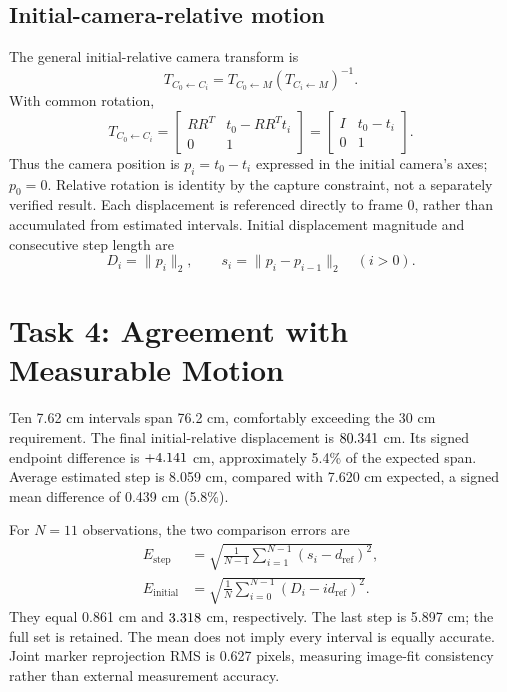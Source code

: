 \documentclass[conference,letterpaper]{IEEEtran}
\begin{document}
\subsection{Initial-camera-relative motion}
The general initial-relative camera transform is
\begin{equation}
T_{C_0\leftarrow C_i}=T_{C_0\leftarrow M}
(T_{C_i\leftarrow M})^{-1}.
\end{equation}
With common rotation,
\begin{equation}
T_{C_0\leftarrow C_i}
=\begin{bmatrix}RR^T&t_0-RR^Tt_i\\0&1\end{bmatrix}
=\begin{bmatrix}I&t_0-t_i\\0&1\end{bmatrix}.
\label{eq:relative}
\end{equation}
Thus the camera position is $p_i=t_0-t_i$ expressed in the initial camera's axes; $p_0=0$. Relative rotation is identity by the capture constraint, not a separately verified result. Each displacement is referenced directly to frame 0, rather than accumulated from estimated intervals. Initial displacement magnitude and consecutive step length are
\begin{equation}
D_i=\|p_i\|_2,\qquad s_i=\|p_i-p_{i-1}\|_2\quad(i>0).
\end{equation}

\section{Task 4: Agreement with Measurable Motion}
Ten 7.62 cm intervals span 76.2 cm, comfortably exceeding the 30 cm requirement. The final initial-relative displacement is $80.341$ cm. Its signed endpoint difference is $+4.141$ cm, approximately 5.4\% of the expected span. Average estimated step is 8.059 cm, compared with 7.620 cm expected, a signed mean difference of 0.439 cm (5.8\%).

For $N=11$ observations, the two comparison errors are
\begin{align}
E_{\mathrm{step}}&=\sqrt{\frac1{N-1}\sum_{i=1}^{N-1}(s_i-d_{\mathrm{ref}})^2},\\
E_{\mathrm{initial}}&=\sqrt{\frac1N\sum_{i=0}^{N-1}(D_i-i d_{\mathrm{ref}})^2}.
\end{align}
They equal 0.861 cm and $3.318$ cm, respectively. The last step is 5.897 cm; the full set is retained. The mean does not imply every interval is equally accurate. Joint marker reprojection RMS is 0.627 pixels, measuring image-fit consistency rather than external measurement accuracy.
\end{document}
